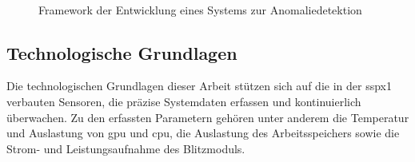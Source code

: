 \begin{figure}[H]
    \centering
    \caption{Framework der Entwicklung eines Systems zur Anomaliedetektion}
~\label{fig:pdm_framework}
\end{figure}

\subsection{Technologische Grundlagen}\label{sec:technologische_grundlagen}
Die technologischen Grundlagen dieser Arbeit stützen sich auf die in der \ac{sspx1} verbauten Sensoren, die präzise Systemdaten erfassen
und kontinuierlich überwachen. Zu den erfassten Parametern gehören unter anderem die Temperatur und Auslastung von \ac{gpu} und \ac{cpu},
die Auslastung des Arbeitsspeichers sowie die Strom- und Leistungsaufnahme des Blitzmoduls.


